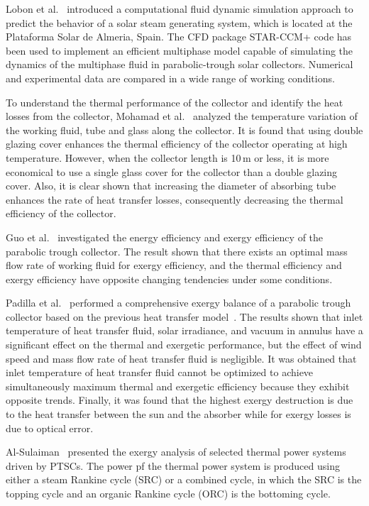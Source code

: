 Lobon et al.~\cite{Lobon2014} introduced a computational fluid dynamic simulation approach to predict the behavior of a solar steam generating system, which is located at the Plataforma Solar de Almeria, Spain. The CFD package STAR-CCM+ code has been used to implement an efficient multiphase model capable of simulating the dynamics of the multiphase fluid in parabolic-trough solar collectors. Numerical and experimental data are compared in a wide range of working conditions.

To understand the thermal performance of the collector and identify the heat losses from the collector, Mohamad et al.~\cite{Mohamad2014} analyzed the temperature variation of the working fluid, tube and glass along the collector. It is found that using double glazing cover enhances the thermal efficiency of the collector operating at high temperature. However, when the collector length is 10$\,\mathrm{m}$ or less, it is more economical to use a single glass cover for the collector than a double glazing cover.
Also, it is clear shown that increasing the diameter of absorbing tube enhances the rate of heat transfer losses, consequently decreasing the thermal efficiency of the collector.

Guo et al.~\cite{JiangfengGuo2016-1} investigated the energy efficiency and exergy efficiency of the parabolic trough collector. The result shown that there exists an optimal mass flow rate of working fluid for exergy efficiency, and the thermal efficiency and exergy efficiency have opposite changing tendencies under some conditions.

Padilla et al.~\cite{Padilla2014} performed a comprehensive exergy balance of a parabolic trough collector based on the previous heat transfer model~\cite{Padilla2011}. The results shown that inlet temperature of heat transfer fluid, solar irradiance, and vacuum in annulus have a significant effect on the thermal and exergetic performance, but the effect of wind speed and mass flow rate of heat transfer fluid is negligible. It was obtained that inlet temperature of heat transfer fluid cannot be optimized to achieve simultaneously maximum thermal and exergetic efficiency because they exhibit opposite trends. Finally, it was found that the highest exergy destruction is due to the heat transfer between the sun and the absorber while for exergy losses is due to optical error.

Al-Sulaiman~\cite{AlSulaiman2014} presented the exergy analysis of selected thermal power systems driven by PTSCs. The power pf the thermal power system is produced using either a steam Rankine cycle (SRC) or a combined cycle, in which the SRC is the topping cycle and an organic Rankine cycle (ORC) is the bottoming cycle.

